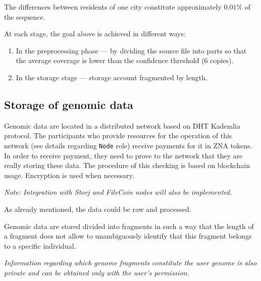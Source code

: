 \begin{note}
  The differences between residents of one city constitute approximately $0.01\%$ of the sequence.
\end{note}

At each stage, the goal above is achieved in different ways:
\begin{enumerate}
  \item In the preprocessing phase --- by dividing the source file into parts so that the average coverage is lower than the confidence threshold (6 copies).
  \item In the storage stage --- storage account fragmented by length.
\end{enumerate}

\subsection{Storage of genomic data}
Genomic data are located in a distributed network based on DHT Kademlia protocol. The participants who provide resources for the operation of this network (see details regarding \verb|Node| role) receive payments for it in ZNA tokens.
In order to receive payment, they need to prove to the network that they are really storing these data. The procedure of this checking is based on blockchain usage.
Encryption is used when necessary.

\begin{note} \it
  Note: Integration with Storj and FileCoin nodes will also be implemented.
\end{note}

As already mentioned, the data could be raw and processed.

\begin{table}[H] \centering
  
\end{table}

Genomic data are stored divided into fragments in such a way that the length of a fragment does not allow to unambiguously identify that this fragment belongs to a specific individual.

\begin{note} \it
  Information regarding which genome fragments constitute the user genome is also private and can be obtained only with the user's permission.
\end{note}
